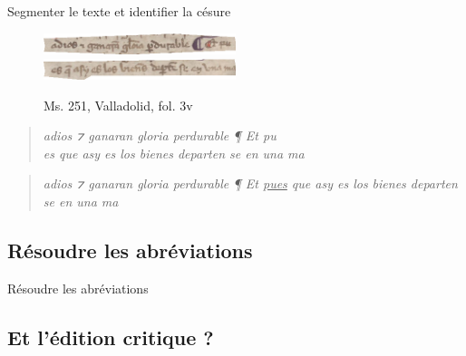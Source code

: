 \documentclass[11pt,aspectratio=169]{beamer}
\begin{document}
\begin{frame}{Segmenter le texte et identifier la césure}
\begin{figure}[htp!]
\begin{center}
\includegraphics[width=0.5\textwidth]{img/ligne_1.png}
\includegraphics[width=0.5\textwidth]{img/ligne_2.png}
\caption{Ms. 251, Valladolid, fol. 3v}
\end{center}
\end{figure}
\begin{quote}
\begin{center}
\pause\textit{adios ⁊ ganaran gloria perdurable ¶ Et pu\\
es que asy es los bienes departen se en una ma}
\end{center}
\end{quote}
\begin{center}
\pause{\color{black}$\Updownarrow$}
\end{center}
\begin{quote}
\begin{center}
\pause\textit{adios ⁊ ganaran gloria perdurable ¶ Et \underline{pues} que asy es los bienes departen se en una ma}
\end{center}
\end{quote}
\end{frame}

\subsection{Résoudre les abréviations}
\begin{frame}{Résoudre les abréviations}
\begin{center}

\end{center}
\end{frame}


\subsection{Et l'édition critique ?}
\end{document}
